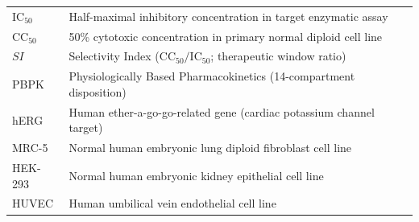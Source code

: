\begin{table}[h!]
\begin{tabular}{lp{10.5cm}}
$\text{IC}_{50}$ & Half-maximal inhibitory concentration in target enzymatic assay \\
$\text{CC}_{50}$ & 50\% cytotoxic concentration in primary normal diploid cell line \\
$SI$ & Selectivity Index ($\text{CC}_{50} / \text{IC}_{50}$; therapeutic window ratio) \\
PBPK & Physiologically Based Pharmacokinetics (14-compartment disposition) \\
hERG & Human ether-a-go-go-related gene (cardiac potassium channel target) \\
MRC-5 & Normal human embryonic lung diploid fibroblast cell line \\
HEK-293 & Normal human embryonic kidney epithelial cell line \\
HUVEC & Human umbilical vein endothelial cell line \\
\bottomrule
\end{tabular}
\end{table}

\vspace{1em}

